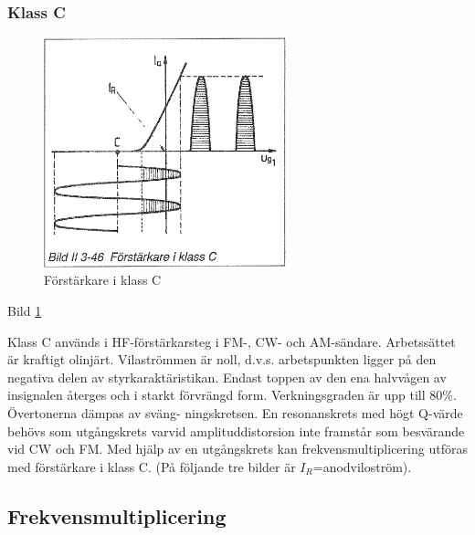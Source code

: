 \subsubsection{Klass C}

\begin{figure}[h]
\begin{center}
\includegraphics[width=7cm]{images/bild_2_3-46}
\caption{Förstärkare i klass C}
\label{fig:BildII3-46}
\end{center}
\end{figure}

Bild \ref{fig:BildII3-46}

Klass C används i HF-förstärkarsteg i FM-, CW- och
AM-sändare. Arbetssättet är kraftigt olinjärt. Vilaströmmen är noll,
d.v.s. arbetspunkten ligger på den negativa delen av
styrkaraktäristikan. Endast toppen av den ena halvvågen av insignalen
återges och i starkt förvrängd form. Verkningsgraden är upp till
80\%. Övertonerna dämpas av sväng- ningskretsen. En resonanskrets med
högt Q-värde behövs som utgångskrets varvid amplituddistorsion inte
framstår som besvärande vid CW och FM. Med hjälp av en utgångskrets
kan frekvensmultiplicering utföras med förstärkare i klass C.  (På
följande tre bilder är \(I_R\)=anodviloström).

\subsection{Frekvensmultiplicering}

